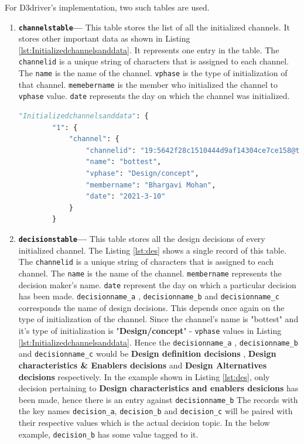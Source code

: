 For D3driver's implementation, two such tables are used. 
\begin{enumerate}
\item \textbf{\texttt{channelstable}--- } This table stores the list of all the initialized channels. It stores other important data as shown in Listing \ref{lst:Initializedchannelsanddata}. It represents one entry in the table. The \texttt{channelid} is a unique string of characters that is assigned to each channel. The \texttt{name} is the name of the channel. \texttt{vphase} is the type of initialization of that channel. \texttt{memebername} is the member who initialized the channel to \texttt{vphase} value. \texttt{date} represents the day on which the channel was initialized.
\begin{lstlisting}[caption={Initialized channels data},label={lst:Initializedchannelsanddata},language=python]
    "Initializedchannelsanddata": {
        "1": {
            "channel": {
                "channelid": "19:5642f28c1510444d9af14304ce7ce158@thread.tacv2",
                "name": "bottest",
                "vphase": "Design/concept",
                "membername": "Bhargavi Mohan",
                "date": "2021-3-10"
            }
        }
\end{lstlisting}
\item \textbf{\texttt{decisionstable}---} This table stores all the design decisions of every initialized channel. The Listing \ref{lst:des} shows a single record of this table. The \texttt{channelid} is a unique string of characters that is assigned to each channel. The \texttt{name} is the name of the channel. \texttt{membername} represents the decision maker's name. \texttt{date} represent the day on which a particular decision has been made. \texttt{decisionname\_a} , \texttt{decisionname\_b} and \texttt{decisionname\_c} corresponds the name of design decisions. This depends once again on the type of initialization of the channel. Since the channel's name is "bottest" and it's type of initialization is "\textbf{Design/concept}" - \texttt{vphase} values in Listing \ref{lst:Initializedchannelsanddata}. Hence the \texttt{decisionname\_a} , \texttt{decisionname\_b} and \texttt{decisionname\_c} would be \textbf{Design definition decisions} , \textbf{Design characteristics \& Enablers decisions} and \textbf{Design Alternatives decisions} respectively.
In the example shown in Listing \ref{lst:des}, only decision pertaining to \textbf{Design characteristics and enablers desicions} has been made, hence there is an entry against \texttt{decisionname\_b}
The records with the key names \texttt{decision\_a}, \texttt{decision\_b} and \texttt{decision\_c} will be paired with their respective values which is the actual decision topic. In the below example, \texttt{decision\_b} has some value tagged to it.


\end{enumerate}

